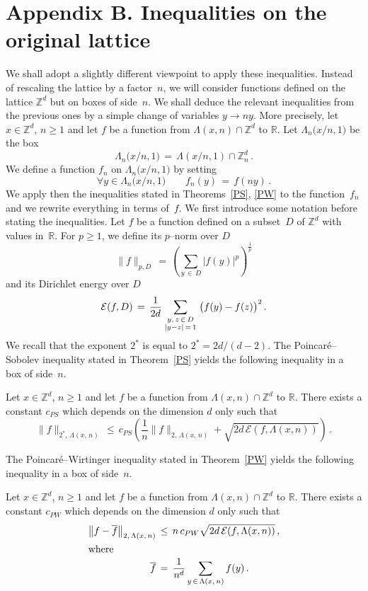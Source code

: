 \documentclass[10pt]{amsart}
\theoremstyle{definition}\newtheorem{defi}[theo]{Definition}\newtheorem{rema}[theo]{Remark}\newtheorem{exam}[theo]{Example}\newtheorem{exem}[theo]{Example}\newtheorem{nota}[theo]{Notation}
\newcommand{\tatop}[2]{\genfrac{}{}{0pt}{1}{#1}{#2}}
\newcommand*\Zd {{\mathbb Z^d}}
\newcommand*\Znd {{\mathbb Z_n^d}}
\newcommand*\R{\mathbb{R}}
\newcommand*\baf {{\overline f}}
\newcommand*\La {{\Lambda}}
\newcommand{\cE}{\mathcal{E}}
\let\oldforall\forall
\renewcommand*{\forall}{\mathrel{\oldforall}}
\begin{document}
\section*{Appendix B. Inequalities on the original lattice}
We shall adopt a slightly different viewpoint to apply these inequalities. Instead of rescaling the lattice by a factor~$n$, we will consider functions defined on the lattice $\Zd$ but on boxes of side~$n$. We shall deduce the relevant inequalities from the previous ones by a simple change of variables $y\to ny$. More precisely, let $x\in\Zd$, $n\geq 1$ and let $f$ be a function from $\La(x,n)\cap\Zd$ to $\R$. Let $\La_n\big({x}/{n},1\big)$ be the box
\[
\La_n\big({x}/{n},1\big)\,=\,\La(x/n,1)\cap\Znd\,.
\]
We define a function $f_n$ on $\La_n\big({x}/{n},1\big)$ by setting
\[
\forall y
\in\La_n\big({x}/{n},1\big)
\qquad f_n(y)\,=\,f(ny)\,.
\]
We apply then the inequalities stated in Theorems~\ref{PS}, \ref{PW} to the function~$f_n$ and we rewrite everything in terms of~$f$. We first introduce some notation before stating the inequalities. Let $f$ be a function defined on a subset~$D$ of $\Zd$ with values in~$\R$. For $p\geq 1$, we define its $p$--norm over $D$
\[
\|f\|_{p,D}\,=\,
\left(\sum_{y\,\in\,D} |f(y)|^p\right)^{\frac{1}{p}}
\]
and its Dirichlet energy over $D$
\[
\cE(f,D)\,=\,
\frac{1}{2d}
\sum_{\tatop{y,\,z\,\in\,D}{|y-z|\,=\,1}}
\big(f(y)-f(z)\big)^2\,.
\]
We recall that the exponent $2^*$ is equal to $2^*=2d/(d-2)$. The Poincaré--Sobolev inequality stated in Theorem~\ref{PS} yields the following inequality in a box of side~$n$.
\begin{coro}\label{UPS}
Let $x\in\Zd$, $n\geq 1$ and let $f$ be a function from $\La(x,n)\cap\Zd$ to $\R$. There exists a constant $c_{PS}$ which depends on the dimension $d$ only such that
\[
\|f\|_{2^*,\,\La(x,\,n)}
\,\leq\,c_{PS}\left(\frac{1}{n}
\|f\|_{2,\,\La(x,\,n)}+\sqrt{2d\,\cE(f,\La(x,n))}\right)\,.
\]
\end{coro}

The Poincaré--Wirtinger inequality stated in Theorem~\ref{PW} yields the following inequality in a box of side~$n$.
\begin{coro}\label{UPW}
Let $x\in\Zd$, $n\geq 1$ and let $f$ be a function from $\La(x,n)\cap\Zd$ to $\R$. There exists a constant $c_{PW}$ which depends on the dimension $d$ only such that
\begin{align*}
\left\|f-\baf\right\|_{2,\,\La(x,\,n)}
\,&\leq\,n\,c_{PW}
\sqrt{2d\,\cE(f,\La(x,n))}\,,\\
\intertext{where}
\baf\,&=\,
\frac{1}{n^d}
\sum_{y\,\in\,\Lambda(x,\,n)}
f(y)\,.
\end{align*}
\end{coro}
\end{document}
